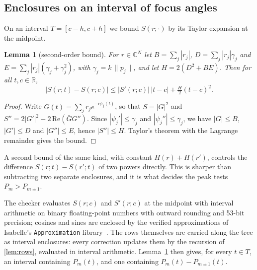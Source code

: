 \documentclass[11pt]{amsart}
\theoremstyle{plain}
\newtheorem{lemma}{Lemma}[section]
\theoremstyle{definition}
\newcommand{\thy}[1]{\texttt{#1}}
\newcommand{\C}{\mathbb{C}}
\newcommand{\R}{\mathbb{R}}
\begin{document}



\subsection{Enclosures on an interval of focus angles}\label{sec:enclosures}

On an interval $T = [c - h, c + h]$ we bound $S(r; \cdot)$ by its Taylor expansion at the midpoint.

\begin{lemma}[second-order bound]\label{lem:taylor}
For $r \in \C^N$ let $B = \sum_j |r_j|$, $D = \sum_j |r_j|\gamma_j$ and
$E = \sum_j |r_j|(\gamma_j + \gamma_j^2)$, with $\gamma_j = k\,\|p_j\|$, and let $H = 2(D^2 + BE)$.
Then for all $t, c \in \R$,
\[ |S(r;t) - S(r;c)| \le |S'(r;c)|\,|t - c| + \tfrac{H}{2}(t - c)^2 . \]
\end{lemma}

\begin{proof}
Write $G(t) = \sum_j r_j e^{-\mathrm{i}\psi_j(t)}$, so that $S = |G|^2$ and $S'' = 2|G'|^2 + 2\,\mathrm{Re}(\bar G G'')$.
Since $|\psi_j'| \le \gamma_j$ and $|\psi_j''| \le \gamma_j$, we have $|G| \le B$, $|G'| \le D$ and
$|G''| \le E$, hence $|S''| \le H$.  Taylor's theorem with the Lagrange remainder gives the bound.
\end{proof}




A second bound of the same kind, with constant $H(r) + H(r')$, controls the difference
$S(r;t) - S(r';t)$ of two powers directly.  This is sharper than subtracting two separate
enclosures, and it is what decides the peak tests $P_m > P_{m \pm 1}$.

The checker evaluates $S(r;c)$ and $S'(r;c)$ at the midpoint with interval arithmetic on binary
floating-point numbers with outward rounding and 53-bit precision; cosines and sines are enclosed by
the verified approximations of Isabelle's \thy{Approximation} library~\cite{Holzl2009}.  The rows
themselves are carried along the tree as interval enclosures: every correction updates them by the
recursion of \cref{lem:rows}, evaluated in interval arithmetic.  Lemma~\ref{lem:taylor} then gives,
for every $t \in T$, an interval containing $P_m(t)$, and one containing $P_m(t) - P_{m\pm1}(t)$.
\end{document}
